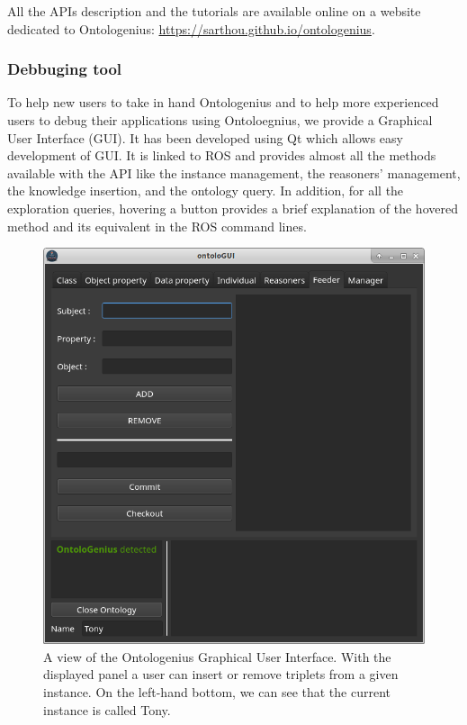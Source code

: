 All the APIs description and the tutorials are available online on a website dedicated to Ontologenius: \url{https://sarthou.github.io/ontologenius}.

\subsubsection{Debbuging tool}

To help new users to take in hand Ontologenius and to help more experienced users to debug their applications using Ontoloegnius, we provide a Graphical User Interface (GUI). It has been developed using Qt which allows easy development of GUI. It is linked to ROS and provides almost all the methods available with the API like the instance management, the reasoners' management, the knowledge insertion, and the ontology query. In addition, for all the exploration queries, hovering a button provides a brief explanation of the hovered method and its equivalent in the ROS command lines.

\begin{figure}[ht!]
\centering
\includegraphics[scale=0.5]{figures/chapter2/ontologui.png}
\caption{\label{fig:chap2_ontologui} A view of the Ontologenius Graphical User Interface. With the displayed panel a user can insert or remove triplets from a given instance. On the left-hand bottom, we can see that the current instance is called Tony.}
\end{figure}

